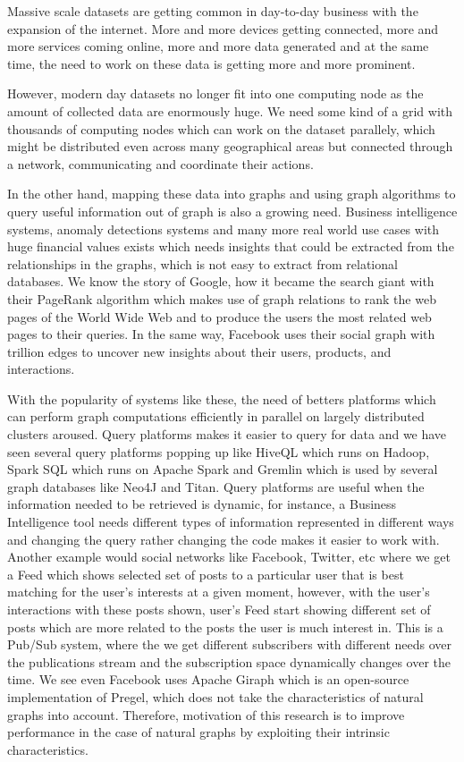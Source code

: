 \documentclass[12pt]{article}
\begin{document}
Massive scale datasets are getting common in day-to-day business with the expansion of the internet. More and more devices getting connected, more and more services coming online, more and more data generated and at the same time, the need to work on these data is getting more and more prominent.

However, modern day datasets no longer fit into one computing node as the amount of collected data are enormously huge.  We need some kind of a grid with thousands of computing nodes which can work on the dataset parallely, which might be distributed even across many geographical areas but connected through a network, communicating and coordinate their actions.

In the other hand, mapping these data into graphs and using graph algorithms to query useful information out of graph is also a growing need. Business intelligence systems, anomaly detections systems and many more real world use cases with huge financial values exists which needs insights that could be extracted from the relationships in the graphs, which is not easy to extract from relational databases. We know the story of Google, how it became the search giant with their PageRank\cite{PageRank} algorithm which makes use of graph relations to rank the web pages of the World Wide Web and to produce the users the most related web pages to their queries. In the same way,   Facebook uses their social graph with trillion edges\cite{Facebook} to uncover new insights about their users, products, and interactions.


With the popularity of systems like these, the need of betters platforms which can perform graph computations efficiently in parallel on largely distributed clusters aroused. Query platforms makes it easier to query for data and we have seen several query platforms popping up like HiveQL which runs on Hadoop, Spark SQL which runs on Apache Spark and Gremlin which is used by several graph databases like Neo4J and Titan. Query platforms are useful when the information needed to be retrieved is dynamic, for instance, a Business Intelligence tool needs different types of information represented in different ways and changing the query rather changing the code makes it easier to work with. Another example would social networks like Facebook, Twitter, etc where we get a Feed which shows selected set of posts to a particular user that is best matching for the user’s interests at a given moment, however, with the user’s interactions with these posts shown, user’s Feed start showing different set of posts which are more related to the posts the user is much interest in. This is a Pub/Sub system, where the we get different subscribers with different needs over the publications stream and the subscription space dynamically changes over the time. We see even Facebook uses\cite{Facebook} Apache Giraph which is an open-source implementation of Pregel\cite{Pregel}, which does not take the characteristics of natural graphs into account. Therefore, motivation of this research is to improve performance in the case of natural graphs by exploiting their intrinsic characteristics.
\end{document}
